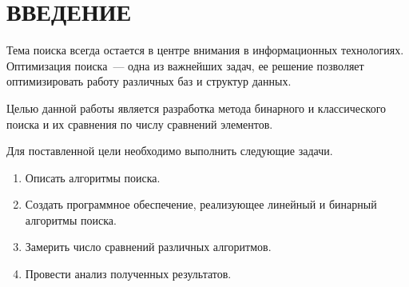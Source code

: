 \chapter*{\hfill{\centering  ВВЕДЕНИЕ}\hfill}


Тема поиска всегда остается в центре внимания в информационных технологиях. Оптимизация поиска~--- одна из важнейших задач, ее решение позволяет оптимизировать работу различных баз и структур данных.~\cite{book_knut}



Целью данной работы является разработка метода бинарного и классического поиска и их сравнения по числу сравнений элементов.

\label{sec:targets}
Для поставленной цели необходимо выполнить следующие задачи.
\begin{enumerate}
	\item Описать алгоритмы поиска.
	\item Создать программное обеспечение, реализующее линейный и бинарный алгоритмы поиска.
	\item Замерить число сравнений различных алгоритмов.
	\item Провести анализ полученных результатов.
\end{enumerate}




